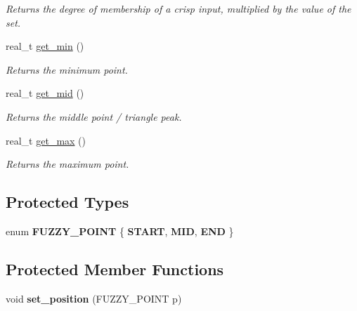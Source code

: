 \begin{DoxyCompactItemize}
\begin{DoxyCompactList}\small\item\em Returns the degree of membership of a crisp input, multiplied by the value of the set. \end{DoxyCompactList}\item 
\hypertarget{classetk_1_1_fuzzy_1_1_set_a79a45ccb7c5190fe712135739239e2eb}{real\-\_\-t \hyperlink{classetk_1_1_fuzzy_1_1_set_a79a45ccb7c5190fe712135739239e2eb}{get\-\_\-min} ()}\label{classetk_1_1_fuzzy_1_1_set_a79a45ccb7c5190fe712135739239e2eb}

\begin{DoxyCompactList}\small\item\em Returns the minimum point. \end{DoxyCompactList}\item 
\hypertarget{classetk_1_1_fuzzy_1_1_set_a7f19df747f340b262df0dc4a351e808d}{real\-\_\-t \hyperlink{classetk_1_1_fuzzy_1_1_set_a7f19df747f340b262df0dc4a351e808d}{get\-\_\-mid} ()}\label{classetk_1_1_fuzzy_1_1_set_a7f19df747f340b262df0dc4a351e808d}

\begin{DoxyCompactList}\small\item\em Returns the middle point / triangle peak. \end{DoxyCompactList}\item 
\hypertarget{classetk_1_1_fuzzy_1_1_set_a787987508e5d9f23c1d066979d01ec61}{real\-\_\-t \hyperlink{classetk_1_1_fuzzy_1_1_set_a787987508e5d9f23c1d066979d01ec61}{get\-\_\-max} ()}\label{classetk_1_1_fuzzy_1_1_set_a787987508e5d9f23c1d066979d01ec61}

\begin{DoxyCompactList}\small\item\em Returns the maximum point. \end{DoxyCompactList}\end{DoxyCompactItemize}
\subsection*{Protected Types}
\begin{DoxyCompactItemize}
\item 
enum {\bfseries F\-U\-Z\-Z\-Y\-\_\-\-P\-O\-I\-N\-T} \{ {\bfseries S\-T\-A\-R\-T}, 
{\bfseries M\-I\-D}, 
{\bfseries E\-N\-D}
 \}
\end{DoxyCompactItemize}
\subsection*{Protected Member Functions}
\begin{DoxyCompactItemize}
\item 
\hypertarget{classetk_1_1_fuzzy_1_1_set_ac02bbfc5d8a4388cdedc2a172cab9209}{void {\bfseries set\-\_\-position} (F\-U\-Z\-Z\-Y\-\_\-\-P\-O\-I\-N\-T p)}\label{classetk_1_1_fuzzy_1_1_set_ac02bbfc5d8a4388cdedc2a172cab9209}

\end{DoxyCompactItemize}
